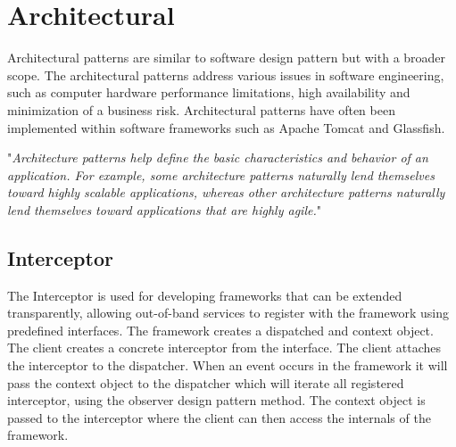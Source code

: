 \section{Architectural}
Architectural patterns are similar to software design pattern but with a broader scope. The architectural patterns address various issues in software engineering, such as computer hardware performance limitations, high availability and minimization of a business risk. Architectural patterns have often been implemented within software frameworks such as Apache Tomcat and Glassfish.

"\textit{Architecture patterns help define the basic characteristics and behavior of an application. For example, some architecture patterns naturally lend themselves toward highly scalable applications,
whereas other architecture patterns naturally lend themselves toward applications that are highly agile.}" \citep{patterns}

\subsection{Interceptor}
The Interceptor is used for developing frameworks that can be extended transparently, allowing out-of-band services to register with the framework using predefined interfaces. The framework creates  a dispatched and context object. The client creates a concrete interceptor from the interface. The client attaches the interceptor to the dispatcher. When an event occurs in the framework it will pass the context object to the dispatcher which will iterate all registered interceptor, using the observer design pattern method. The context object is passed to the interceptor where the client can then access the internals of the framework.

